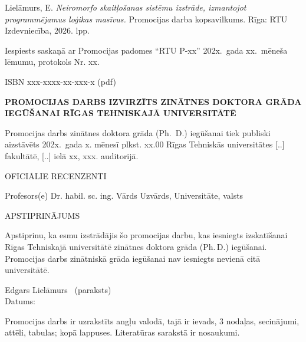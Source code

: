 %

\noindent\hfill
\begin{minipage}{0.5\textwidth}
Lielāmurs, E. \textit{Neiromorfo skaitļošanas sistēmu izstrāde, izmantojot programmējamus loģikas masīvus.}
Promocijas darba kopsavilkums. Rīga: RTU Izdevniecība, 2026. \pageref{LastPage} lpp.

\vspace{1cm}

Iespiests saskaņā ar Promocijas padomes “RTU P-xx” 202x. gada xx. mēneša lēmumu, protokols Nr. xx.
\end{minipage}

\vfill
\noindent ISBN xxx-xxxx-xx-xxx-x  (pdf)
\clearpage
\begin{center}
\bfseries PROMOCIJAS DARBS IZVIRZĪTS ZINĀTNES DOKTORA GRĀDA IEGŪŠANAI RĪGAS TEHNISKAJĀ UNIVERSITĀTĒ
\end{center}
Promocijas darbs zinātnes doktora grāda (Ph. D.) iegūšanai tiek publiski aizstāvēts 202x. gada x. mēnesī plkst. xx.00 Rīgas
Tehniskās universitātes [..] fakultātē, [..] ielā xx, xxx. auditorijā.

\vspace{2cm}
\noindent OFICIĀLIE RECENZENTI

\noindent Profesors(e) Dr. habil. sc. ing. Vārds Uzvārds, Universitāte, valsts 

\vfill
\begin{center} APSTIPRINĀJUMS\end{center}
Apstiprinu, ka esmu izstrādājis šo promocijas darbu, kas iesniegts izskatīšanai Rīgas Tehniskajā universitātē zinātnes
doktora grāda (Ph.\,D.) iegūšanai. Promocijas darbs zinātniskā grāda iegūšanai nav iesniegts nevienā citā universitātē.

\noindent Edgars Lielāmurs \dotfill\ (paraksts)\\
Datums: \dotfill

\medskip
\noindent Promocijas darbs ir uzrakstīts angļu valodā, tajā ir ievads, 3 nodaļas, secinājumi,  attēli,
 tabulas; kopā \pageref{LastPage} lappuses. Literatūras sarakstā ir  nosaukumi.
\clearpage
